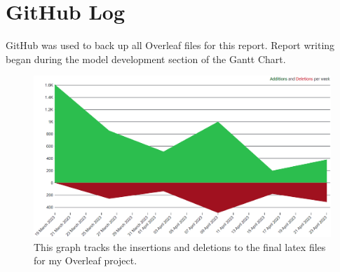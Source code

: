 \chapter{GitHub Log}

GitHub was used to back up all Overleaf files for this report. Report writing began during the model development section of the Gantt Chart. 


\begin{figure}[!htb]
    \includegraphics[width=13cm,center]{Figures/GithubGraph.png}
    \caption*{This graph tracks the insertions and deletions to the final latex files for my Overleaf project.}
    \label{Figure:GithubGraph}
\end{figure}